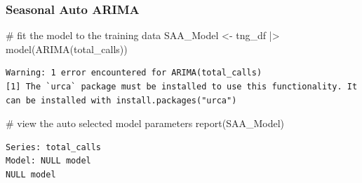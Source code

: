 \documentclass[
  letterpaper,
  DIV=11,
  numbers=noendperiod]{scrartcl}
\newenvironment{Shaded}{\begin{snugshade}}{\end{snugshade}}
\newcommand{\AttributeTok}[1]{\textcolor[rgb]{0.40,0.45,0.13}{#1}}
\newcommand{\CommentTok}[1]{\textcolor[rgb]{0.37,0.37,0.37}{#1}}
\newcommand{\FunctionTok}[1]{\textcolor[rgb]{0.28,0.35,0.67}{#1}}
\newcommand{\NormalTok}[1]{\textcolor[rgb]{0.00,0.23,0.31}{#1}}
\newcommand{\OtherTok}[1]{\textcolor[rgb]{0.00,0.23,0.31}{#1}}
\newcommand{\SpecialCharTok}[1]{\textcolor[rgb]{0.37,0.37,0.37}{#1}}
\newcommand{\StringTok}[1]{\textcolor[rgb]{0.13,0.47,0.30}{#1}}
\begin{document}
\subsubsection{Seasonal Auto ARIMA}\label{seasonal-auto-arima}

\begin{Shaded}
\begin{Highlighting}[]
\CommentTok{\# fit the model to the training data}
\NormalTok{SAA\_Model }\OtherTok{\textless{}{-}}\NormalTok{ tng\_df }\SpecialCharTok{|\textgreater{}}
  \FunctionTok{model}\NormalTok{(}\FunctionTok{ARIMA}\NormalTok{(total\_calls))}
\end{Highlighting}
\end{Shaded}

\begin{verbatim}
Warning: 1 error encountered for ARIMA(total_calls)
[1] The `urca` package must be installed to use this functionality. It can be installed with install.packages("urca")
\end{verbatim}

\begin{Shaded}
\begin{Highlighting}[]
\CommentTok{\# view the auto selected model parameters}
\FunctionTok{report}\NormalTok{(SAA\_Model)}
\end{Highlighting}
\end{Shaded}

\begin{verbatim}
Series: total_calls 
Model: NULL model 
NULL model
\end{verbatim}

\begin{Shaded}
\end{Shaded}
\end{document}
